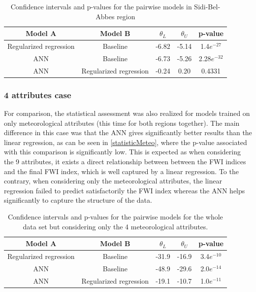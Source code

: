 \documentclass[10pt]{article}
\numberwithin{equation}{section}
\numberwithin{figure}{section}
\numberwithin{table}{section}
\begin{document}
\begin{table}[H]
\centering
\begin{tabular}{|c|c|c|c|c|} \hline
\textbf{Model A}  & \textbf{Model B}  & \textbf{$\theta_L$} & \textbf{$\theta_U$} & \textbf{p-value} \\ \hline
Regularized regression & Baseline          & -6.82               & -5.14              & 1.4$e^{-27}$     \\ \hline
ANN               & Baseline          & -6.73               & -5.26           & 2.28$e^{-32}$     \\ \hline
ANN               & Regularized regression & -0.24             & 0.20              & 0.4331   \\ \hline
\end{tabular}
\caption{Confidence intervals and p-values for the pairwise models in Sidi-Bel-Abbes region}
\label{Table2}
\end{table}








\subsubsection{4 attributes case}

For comparison, the statistical assessment was also realized for models trained on only meteorological attributes (this time for both regions together). The main difference in this case was that the ANN gives significantly better results than the linear regression, as can be seen in \autoref{statisticMeteo}, where the p-value associated with this comparison is significantly low. This is expected as when considering the 9 attributes, it exists a direct relationship between between the FWI indices and the final FWI index, which is well captured by a linear regression. To the contrary, when considering only the meteorological attributes, the linear regression failed to predict satisfactorily the FWI index whereas the ANN helps significantly to capture the structure of the data.

\begin{table}[H]
\centering
\begin{tabular}{|c|c|c|c|c|} \hline
\textbf{Model A}  & \textbf{Model B}  & \textbf{$\theta_L$} & \textbf{$\theta_U$} & \textbf{p-value} \\ \hline
Regularized regression & Baseline          & -31.9               & -16.9              & 3.4$e^{-10}$     \\ \hline
ANN               & Baseline          & -48.9               & -29.6           & 2.0$e^{-14}$     \\ \hline
ANN               & Regularized regression & -19.1             & -10.7              & 1.0$e^{-11}$   \\ \hline
\end{tabular}
\label{porcodio2}
\caption{Confidence intervals and p-values for the pairwise models for the whole data set but considering only the 4 meteorological attributes.}
\label{statisticMeteo}
\end{table}
\end{document}
